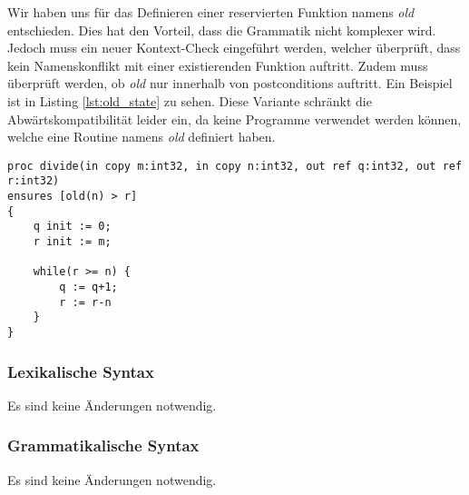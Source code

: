 Wir haben uns für das Definieren einer reservierten Funktion namens \textit{old} 
entschieden. Dies hat den Vorteil, dass die Grammatik nicht komplexer wird. Jedoch 
muss ein neuer Kontext-Check eingeführt werden, welcher überprüft, dass kein Namenskonflikt
mit einer existierenden Funktion auftritt. Zudem muss überprüft werden, ob \textit{old} 
nur innerhalb von postconditions auftritt. Ein Beispiel ist in Listing \ref{lst:old_state} zu sehen.
Diese Variante schränkt die Abwärtskompatibilität leider ein, da keine Programme verwendet 
werden können, welche eine Routine namens \textit{old} definiert haben.
\newpage
\begin{lstlisting}[caption=Beispiel eines Zugriffs auf alten Zustand,label={lst:old_state}]
proc divide(in copy m:int32, in copy n:int32, out ref q:int32, out ref r:int32)
ensures [old(n) > r]
{
    q init := 0;
    r init := m;

    while(r >= n) {
        q := q+1;
        r := r-n
    }
}
\end{lstlisting}

\subsubsection{Lexikalische Syntax}
Es sind keine Änderungen notwendig.

\subsubsection{Grammatikalische Syntax}
Es sind keine Änderungen notwendig.


\newpage
